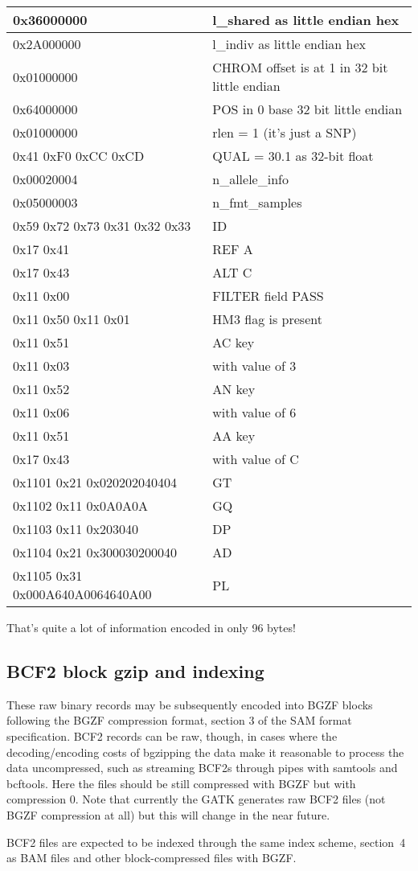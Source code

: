 \documentclass[8pt]{article}
\begin{document}
\vspace{0.3cm}
\begin{tabular}{|l| l|} \hline
0x36000000 & l\_shared as little endian hex \\ \hline
0x2A000000 & l\_indiv as little endian hex \\ \hline
0x01000000 & CHROM offset is at 1 in 32 bit little endian \\ \hline
0x64000000 & POS in 0 base 32 bit little endian \\ \hline
0x01000000 & rlen = 1 (it's just a SNP) \\ \hline
0x41 0xF0 0xCC 0xCD & QUAL = 30.1 as 32-bit float \\ \hline
0x00020004 & n\_allele\_info \\ \hline
0x05000003 & n\_fmt\_samples \\ \hline
0x59 0x72 0x73 0x31 0x32 0x33 & ID \\ \hline
0x17 0x41 & REF A \\ \hline
0x17 0x43 & ALT C \\ \hline
0x11 0x00 & FILTER field PASS \\ \hline
0x11 0x50 0x11 0x01 & HM3 flag is present \\ \hline
0x11 0x51 & AC key \\ \hline
0x11 0x03 & with value of 3 \\ \hline
0x11 0x52 & AN key \\ \hline
0x11 0x06 & with value of 6 \\ \hline
0x11 0x51 & AA key \\ \hline
0x17 0x43 & with value of C \\ \hline
0x1101 0x21 0x020202040404 & GT \\ \hline
0x1102 0x11 0x0A0A0A & GQ \\ \hline
0x1103 0x11 0x203040 & DP \\ \hline
0x1104 0x21 0x300030200040 & AD \\ \hline
0x1105 0x31 0x000A640A0064640A00 & PL \\ \hline
\end{tabular}
\vspace{0.3cm}

That's quite a lot of information encoded in only 96 bytes!

\subsection{BCF2 block gzip and indexing}

These raw binary records may be subsequently encoded into BGZF blocks following
the BGZF compression format, section 3 of the SAM format specification.
BCF2 records can be raw, though, in cases where the decoding/encoding costs of
bgzipping the data make it reasonable to process the data uncompressed, such as
streaming BCF2s through pipes with samtools and bcftools.  Here the files
should be still compressed with BGZF but with compression 0.  Note that
currently the GATK generates raw BCF2 files (not BGZF compression at all) but
this will change in the near future.

BCF2 files are expected to be indexed through the same index scheme,
section~4 as BAM files and other block-compressed files with BGZF.
\end{document}
